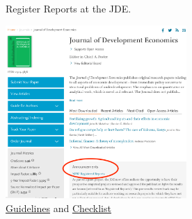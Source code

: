 \documentclass{beamer}
\begin{document}
{ %
    \begin{frame}[plain, label=AEAreg]
     \end{frame}
}



\begin{frame}{Register Reports at the JDE.}

\includegraphics[height=2.6in]{../Images/RR.png}\\
\href{https://www.elsevier.com/__data/promis_misc/JDE_RR_Author_Guidelines.pdf}{Guidelines}
and
\href{https://docs.google.com/spreadsheets/d/1zhG3AxOJIB7H1m4-S0jwMN1cQKNVsLomsxktEDVrbP8/edit\#gid=1835444640}{Checklist}

\end{frame}
\end{document}
